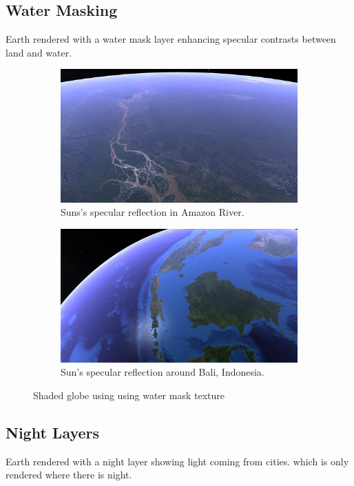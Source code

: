 \subsection{Water Masking}
\FloatBarrier
Earth rendered with a water mask layer enhancing specular contrasts between land and water.
\begin{figure}[h]
    \centering
    \begin{subfigure}[bt]{0.9\textwidth}
        \includegraphics[width=\textwidth]{figures/results/screenshots/specular_brazil.png}
        \caption{Suns's specular reflection in Amazon River.}
    \end{subfigure}
    \begin{subfigure}[bt]{0.9\textwidth}
        \includegraphics[width=\textwidth]{figures/results/screenshots/specular_indonesia.png}
        \caption{Sun's specular reflection around Bali, Indonesia.}
    \end{subfigure}
    \caption{Shaded globe using using water mask texture}
\end{figure}

\clearpage
\subsection{Night Layers}
\FloatBarrier
Earth rendered with a night layer showing light coming from cities. which is only rendered where there is night. 

